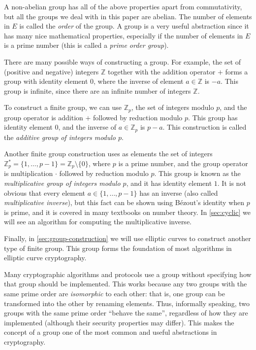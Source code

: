 \documentclass[manuscript]{acmart}
\begin{document}
A non-abelian group has all of the above properties apart from commutativity, but all the groups we deal with in this paper are abelian.
The number of elements in $E$ is called the \emph{order} of the group.
A group is a very useful abstraction since it has many nice mathematical properties, especially if the number of elements in $E$ is a prime number (this is called a \emph{prime order group}).

There are many possible ways of constructing a group.
For example, the set of (positive and negative) integers $\mathbb{Z}$ together with the addition operator $+$ forms a group with identity element $0$, where the inverse of element $a \in \mathbb{Z}$ is $-a$.
This group is infinite, since there are an infinite number of integers $\mathbb{Z}$.

To construct a finite group, we can use $\mathbb{Z}_p$, the set of integers modulo $p$, and the group operator is addition $+$ followed by reduction modulo $p$.
This group has identity element $0$, and the inverse of $a \in \mathbb{Z}_p$ is $p-a$.
This construction is called the \emph{additive group of integers modulo $p$}.

Another finite group construction uses as elements the set of integers $\mathbb{Z}_p^* = \{1,\dots, p-1\} = \mathbb{Z}_p \setminus \{0\}$, where $p$ is a prime number, and the group operator is multiplication $\cdot$ followed by reduction modulo $p$.
This group is known as the \emph{multiplicative group of integers modulo $p$}, and it has identity element $1$.
It is not obvious that every element $a \in \{1,\dots, p-1\}$ has an inverse (also called \emph{multiplicative inverse}), but this fact can be shown using Bézout's identity when $p$ is prime, and it is covered in many textbooks on number theory.
In \autoref{sec:cyclic} we will see an algorithm for computing the multiplicative inverse.

Finally, in \autoref{sec:group-construction} we will use elliptic curves to construct another type of finite group.
This group forms the foundation of most algorithms in elliptic curve cryptography.

Many cryptographic algorithms and protocols use a group without specifying how that group should be implemented.
This works because any two groups with the same prime order are \emph{isomorphic} to each other: that is, one group can be transformed into the other by renaming elements.
Thus, informally speaking, two groups with the same prime order ``behave the same'', regardless of how they are implemented (although their security properties may differ).
This makes the concept of a group one of the most common and useful abstractions in cryptography.
\end{document}
